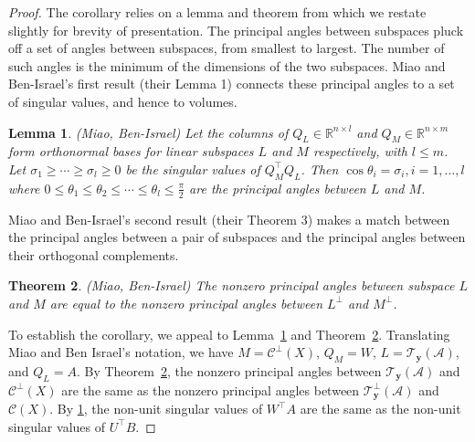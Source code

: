 \documentclass[11pt]{article}
\newcommand{\mc}{\mathcal}
\newtheorem{theorem}{Theorem}[section]
\newtheorem{lemma}[theorem]{\bf Lemma}
\begin{document}
\begin{proof}
The corollary relies on a lemma and theorem from \cite{miao1992} which we restate 
slightly for brevity of presentation.  The principal angles between subspaces pluck off a
set of angles between subspaces, from smallest to largest.  The number of such angles 
is the minimum of the dimensions of the two subspaces.  Miao and Ben-Israel's first result
(their Lemma 1) connects these principal angles to a set of singular values, and hence to 
volumes.   
\begin{lemma}{(Miao, Ben-Israel)}
\label{MBI:lemma}
Let the columns of $Q_L\in \mathbb{R}^{n\times l}$ and $Q_M\in
\mathbb{R}^{n\times m}$ form orthonormal bases for linear subspaces
$L$ and $M$ respectively, with $l \leq m$. Let $\sigma_1\geq\cdots\geq
\sigma_l\geq0$ be the singular values of $Q_M^\top Q_L$. Then $\cos
\theta_i=\sigma_i, i=1,\dots,l$ where $0\leq\theta_1\leq\theta_2\leq
\cdots \leq\theta_l\leq\frac{\pi}{2}$ are the principal angles between $L$ and $M$.  
\end{lemma}

Miao and Ben-Israel's second result (their Theorem 3) makes a match between the principal
angles between a pair of subspaces and the principal angles between their orthogonal complements.  
\begin{theorem}{(Miao, Ben-Israel)}
\label{MBI:thm}
The nonzero principal angles between subspace $L$ and $M$ are equal to the 
nonzero principal angles between $L^\perp$ and $M^\perp$.
\end{theorem}

To establish the corollary, we appeal to Lemma~\ref{MBI:lemma} and Theorem~\ref{MBI:thm}.  Translating Miao and Ben Israel's
notation, we have $M=\mc C^\perp (X)$, $Q_M=W$, $L=\mc
T_{\boldsymbol{y}}(\mc{A})$, and $Q_L= A$. By Theorem~\ref{MBI:thm}, the
nonzero principal angles between $\mc{T}_{\boldsymbol{y}}(\mc{A})$ and
$\mc C^\perp(X)$ are the same as the nonzero principal angles between
$\mathcal{T}_{\boldsymbol{y}}^\perp(\mathcal{A})$ and $\mc C(X)$. By
\ref{MBI:lemma}, the non-unit singular values of $W^\top A$ are the
same as the non-unit singular values of $U^\top B$.  
\end{proof}
\end{document}
